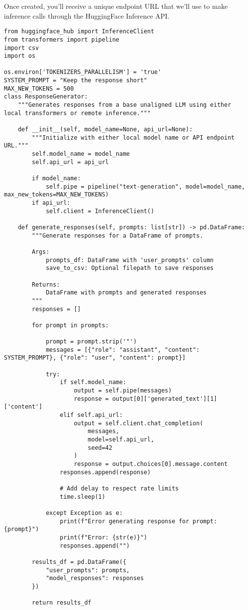 Once created, you'll receive a unique endpoint URL that we'll use to make inference calls through the HuggingFace Inference API.

\begin{verbatim}
from huggingface_hub import InferenceClient
from transformers import pipeline
import csv
import os

os.environ['TOKENIZERS_PARALLELISM'] = 'true'
SYSTEM_PROMPT = "Keep the response short"
MAX_NEW_TOKENS = 500
class ResponseGenerator:
    """Generates responses from a base unaligned LLM using either local transformers or remote inference."""
    
    def __init__(self, model_name=None, api_url=None):
        """Initialize with either local model name or API endpoint URL."""
        self.model_name = model_name
        self.api_url = api_url
        
        if model_name:
            self.pipe = pipeline("text-generation", model=model_name, max_new_tokens=MAX_NEW_TOKENS)
        if api_url:
            self.client = InferenceClient()
            
    def generate_responses(self, prompts: list[str]) -> pd.DataFrame:
        """Generate responses for a DataFrame of prompts.
        
        Args:
            prompts_df: DataFrame with 'user_prompts' column
            save_to_csv: Optional filepath to save responses
            
        Returns:
            DataFrame with prompts and generated responses
        """
        responses = []
        
        for prompt in prompts:
            
            prompt = prompt.strip('"')
            messages = [{"role": "assistant", "content": SYSTEM_PROMPT}, {"role": "user", "content": prompt}]
            
            try:
                if self.model_name:
                    output = self.pipe(messages)
                    response = output[0]['generated_text'][1]['content']
                elif self.api_url:
                    output = self.client.chat_completion(
                        messages,
                        model=self.api_url, 
                        seed=42
                    )
                    response = output.choices[0].message.content
                responses.append(response)
                
                # Add delay to respect rate limits
                time.sleep(1)
                
            except Exception as e:
                print(f"Error generating response for prompt: {prompt}")
                print(f"Error: {str(e)}")
                responses.append("")
                
        results_df = pd.DataFrame({
            "user_prompts": prompts,
            "model_responses": responses
        })
        
        return results_df
\end{verbatim}

